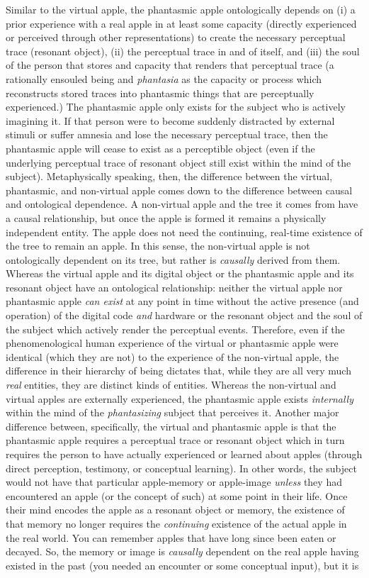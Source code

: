 \documentclass{article}
\begin{document}
Similar to the virtual apple, the phantasmic apple ontologically depends on (i) a prior experience with a real apple in at least some capacity (directly experienced or perceived through other representations) to create the necessary perceptual trace (resonant object), (ii) the perceptual trace in and of itself, and (iii) the soul of the person that stores and capacity that renders that perceptual trace (a rationally ensouled being and \textit{phantasia} as the capacity or process which reconstructs stored traces into phantasmic things that are perceptually experienced.) The phantasmic apple only exists for the subject who is actively imagining it. If that person were to become suddenly distracted by external stimuli or suffer amnesia and lose the necessary perceptual trace, then the phantasmic apple will cease to exist as a perceptible object (even if the underlying perceptual trace of resonant object still exist within the mind of the subject). Metaphysically speaking, then, the difference between the virtual, phantasmic, and non-virtual apple comes down to the difference between causal and ontological dependence. A non-virtual apple and the tree it comes from have a causal relationship, but once the apple is formed it remains a physically independent entity. The apple does not need the continuing, real-time existence of the tree to remain an apple. In this sense, the non-virtual apple is not ontologically dependent on its tree, but rather is \textit{causally} derived from them. Whereas the virtual apple and its digital object or the phantasmic apple and its resonant object have an ontological relationship: neither the virtual apple nor phantasmic apple \textit{can exist} at any point in time without the active presence (and operation) of the digital code \textit{and} hardware or the resonant object and the soul of the subject which actively render the perceptual events. Therefore, even if the phenomenological human experience of the virtual or phantasmic apple were identical (which they are not) to the experience of the non-virtual apple, the difference in their hierarchy of being dictates that, while they are all very much \textit{real} entities, they are distinct kinds of entities. Whereas the non-virtual and virtual apples are externally experienced, the phantasmic apple exists \textit{internally} within the mind of the \textit{phantasizing} subject that perceives it. Another major difference between, specifically, the virtual and phantasmic apple is that the phantasmic apple requires a perceptual trace or resonant object which in turn requires the person to have actually experienced or learned about apples (through direct perception, testimony, or conceptual learning). In other words, the subject would not have that particular apple-memory or apple-image \textit{unless} they had encountered an apple (or the concept of such) at some point in their life. Once their mind encodes the apple as a resonant object or memory, the existence of that memory no longer requires the \textit{continuing} existence of the actual apple in the real world. You can remember apples that have long since been eaten or decayed. So, the memory or image is \textit{causally} dependent on the real apple having existed in the past (you needed an encounter or some conceptual input), but it is 
\end{document}
